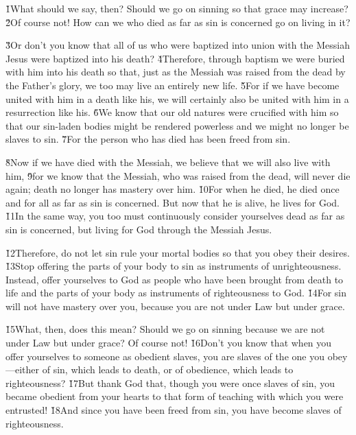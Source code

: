 \v{1}What should we say, then? Should we go on sinning so that grace may increase? \v{2}Of course not! How can we who died as far as sin is concerned go on living in it?

\v{3}Or don't you know that all of us who were baptized into union with the Messiah Jesus were baptized into his death? \v{4}Therefore, through baptism we were buried with him into his death so that, just as the Messiah was raised from the dead by the Father's glory, we too may live an entirely new life. \v{5}For if we have become united with him in a death like his, we will certainly also be united with him in a resurrection like his. \v{6}We know that our old natures were crucified with him so that our sin-laden bodies might be rendered powerless and we might no longer be slaves to sin. \v{7}For the person who has died has been freed from sin.

\v{8}Now if we have died with the Messiah, we believe that we will also live with him, \v{9}for we know that the Messiah, who was raised from the dead, will never die again; death no longer has mastery over him. \v{10}For when he died, he died once and for all as far as sin is concerned. But now that he is alive, he lives for God. \v{11}In the same way, you too must continuously consider yourselves dead as far as sin is concerned, but living for God through the Messiah Jesus.

\v{12}Therefore, do not let sin rule your mortal bodies so that you obey their desires. \v{13}Stop offering the parts of your body to sin as instruments of unrighteousness. Instead, offer yourselves to God as people who have been brought from death to life and the parts of your body as instruments of righteousness to God. \v{14}For sin will not have mastery over you, because you are not under Law but under grace.

\v{15}What, then, does this mean? Should we go on sinning because we are not under Law but under grace? Of course not! \v{16}Don't you know that when you offer yourselves to someone as obedient slaves, you are slaves of the one you obey---either of sin, which leads to death, or of obedience, which leads to righteousness? \v{17}But thank God that, though you were once slaves of sin, you became obedient from your hearts to that form of teaching with which you were entrusted! \v{18}And since you have been freed from sin, you have become slaves of righteousness.

